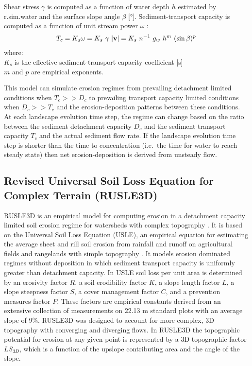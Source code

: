 \documentclass[gmd, manuscript]{copernicus}
\begin{document}
\noindent
Shear stress $\gamma $ is computed
as a function of water depth $h$ estimated by r.sim.water
and the surface slope angle $\beta$ [$\unit{\degree}$].
%
Sediment-transport capacity is computed as a function 
of unit stream power $\omega$ \citep{Moore1986}:
\smallskip
\begin{equation}
\label{eq:tc_streampower}
T_c =K_s \omega = K_s~\gamma~|{\bf v}| =
K_s~n^{-1}~g_w~h^m~(\sin \beta)^p
\end{equation}
{\small
\noindent
where: \\
\noindent
\hspace*{0.5em} $K_s$ is the effective sediment-transport capacity coefficient [s] \\
\hspace*{0.5em} $m$ and $p$ are empirical exponents.
}


This model can simulate erosion regimes 
from prevailing detachment limited conditions when $T_c >> D_c$ 
to prevailing transport capacity limited conditions when $D_c >> T_c$
and the erosion-deposition patterns between these conditions.
At each landscape evolution time step, the regime can change based on 
the ratio between the sediment detachment capacity $D_c$
and the sediment transport capacity $T_c$ and the actual sediment flow rate.
If the landscape evolution time step is shorter than the time to concentration 
(i.e.~the time for water to reach steady state)
then net erosion-deposition is derived from unsteady flow.

\subsection{Revised Universal Soil Loss Equation for Complex Terrain (RUSLE3D)}
\label{rusle_model}
RUSLE3D
is an empirical model for computing erosion 
in a detachment capacity limited soil erosion regime
for watersheds with complex topography \citep{Mitasova1996}. 
It is based on 
the Universal Soil Loss Equation (USLE),
an empirical equation for estimating the average
sheet and rill soil erosion from rainfall and runoff
on agricultural fields and rangelands with simple topography 
\citep{Wischmeier1978}. 
It models erosion dominated regimes without deposition
in which sediment transport capacity is 
uniformly greater than detachment capacity.
In USLE soil loss per unit area is determined by 
an erosivity factor $R$,
a soil erodibility factor $K$, 
a slope length factor $L$,
a slope steepness factor $S$,
a cover management factor $C$,
and a prevention measures factor $P$.
These factors are empirical constants derived 
from an extensive collection of measurements 
on 22.13 \unit{m} standard plots with an average slope of 9$\%$.  
RUSLE3D was designed to account for more complex, 3D topography 
with converging and diverging flows. 
In RUSLE3D the topographic potential for erosion at any given point 
is represented by a 3D topographic factor $LS_{3D}$,
which is a function of the upslope contributing area 
and the angle of the slope. 
\end{document}
